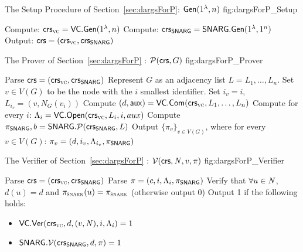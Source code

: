 \begin{subfigures}\label{fig:dargsForP}
    \begin{nicefig}[h]{The Setup Procedure of Section~\ref{sec:dargsForP}: $\mathsf{Gen}(1^\lambda, n)$ }{fig:dargsForP_Setup}
        \begin{algorithmic}[1]
            \State Compute: $\mathsf{crs}_\textsc{vc} = \mathsf{VC}.\mathsf{Gen}(1^\lambda, n)$
            \State Compute: $\mathsf{crs}_{\mathsf{SNARG}} = \mathsf{SNARG}.\mathsf{Gen}(1^\lambda, 1^n)$
            \State Output: $\mathsf{crs} = (\mathsf{crs}_\textsc{vc}, \mathsf{crs}_{\mathsf{SNARG}})$
        \end{algorithmic}
    \end{nicefig}
    
    \begin{nicefig}[h]{The Prover of Section~\ref{sec:dargsForP} : $\mathcal{P}(\mathsf{crs}, G)$ }{fig:dargsForP_Prover}
        \begin{algorithmic}[1]
            \State Parse $\mathsf{crs}=(\mathsf{crs}_\textsc{vc}, \mathsf{crs}_{\mathsf{SNARG}})$
            \State Represent $G$ as an adjacency list $L = L_1,\ldots, L_n$.
                \State Set $v\in V(G)$ to be the node with the $i$ smallest identifier.
                \State Set $i_v = i$, $L_{i_v} = (v, N_G(v_i))$            
            \EndFor
            \State Compute $(d,\mathsf{aux}) = \mathsf{VC}.\mathsf{Com}(\mathsf{crs}_\textsc{vc}, L_1,\ldots, L_n)$
            \State Compute for every $i$: $\Lambda_i = \mathsf{VC}.\mathsf{Open}(\mathsf{crs}_\textsc{vc}, L_i, i, aux)$
            \State Compute $\pi_{\mathsf{SNARG}}, b = \mathsf{SNARG}.\mathcal{P}(\mathsf{crs}_{\mathsf{SNARG}}, L)$
            \State Output $\{\pi_v\}_{v\in V(G)}$, where for every $v\in V(G)$: $\pi_v = (d, i_v, \Lambda_{i_v}, \pi_{\mathsf{SNARG}})$
        \end{algorithmic}
    \end{nicefig}

    \begin{nicefig}[h]{The Verifier of Section~\ref{sec:dargsForP} : $\mathcal{V}(\mathsf{crs}, \mathit{ N }, v, \pi)$ }{fig:dargsForP_Verifier}
        \begin{algorithmic}[1]
            \State Parse $\mathsf{crs}=(\mathsf{crs}_\textsc{vc}, \mathsf{crs}_{\mathsf{SNARG}})$
            \State Parse $\pi = (c, i, \Lambda_i, \pi_{\mathsf{SNARG}})$
            \State Verify that $\forall u\in \mathit{ N }$, $d(u) = d$ and $\pi_\textsc{snark}(u) = \pi_\textsc{snark}$ (otherwise output 0)\label{step:verifyComP}
            \State Output 1 if the following holds:
            \begin{itemize}
                \item $\mathsf{VC}.\mathsf{Ver}(\mathsf{crs}_\textsc{vc}, d, (v,\mathit{ N }), i, \Lambda_i) = 1$
                \item $\mathsf{SNARG}.\mathcal{V}(\mathsf{crs}_{\mathsf{SNARG}}, d, \pi) = 1$
            \end{itemize}
        \end{algorithmic}
    \end{nicefig}
\end{subfigures}


